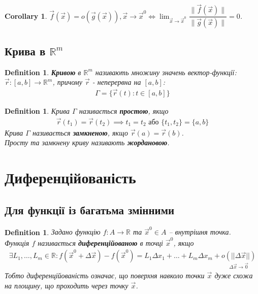 \documentclass[a4paper, 10pt]{article}
\theoremstyle{theoremdd}
\theoremstyle{theoremdd}
\theoremstyle{theoremdd}
\newtheorem{definition}[theorem]{Definition}
\theoremstyle{theoremdd}
\theoremstyle{theoremdd}
\theoremstyle{theoremdd}
\theoremstyle{theoremdd}
\theoremstyle{theoremdd}
\theoremstyle{theoremdd}
\newtheorem{corollary}[theorem]{Corollary}
\newcommand\Norm[1]{\|#1\|}
\begin{document}
\begin{corollary}
$\vec{f}(\vec{x}) = o(\vec{g}(\vec{x})), \vec{x} \to \vec{x}^0 \iff \displaystyle\lim_{\vec{x} \to \vec{x}^0} \dfrac{\Norm{\vec{f}(\vec{x})}}{\Norm{\vec{g}(\vec{x})}} = 0$.
\end{corollary}

\subsection{Крива в $\mathbb{R}^m$}
\begin{definition}
\textbf{Кривою} в $\mathbb{R}^m$ називають множину значень вектор-функції: $\vec{r}: [a,b] \to \mathbb{R}^m$, причому $\vec{r}$ - неперервна на $[a,b]$:
\begin{align*}
\Gamma = \{ \vec{r}(t): t \in [a,b]\}
\end{align*}
\end{definition}

\begin{definition}
Крива $\Gamma$ називається \textbf{простою}, якщо
\begin{align*}
\vec{r}(t_1) = \vec{r}(t_2) \implies t_1 = t_2 \text{ або } \{t_1,t_2\} = \{a,b\}
\end{align*}
Крива $\Gamma$ називається \textbf{замкненою}, якщо $\vec{r}(a) = \vec{r}(b)$.\\
Просту та замкнену криву називають \textbf{жордановою}.
\end{definition}

\newpage

\section{Диференційованість}
\subsection{Для функції із багатьма змінними}
\begin{definition}
Задано функцію $f \colon A \to \mathbb{R}$ та $\vec{x}^0 \in A$ -- внутрішня точка.\\
Функція $f$ називається \textbf{диференційованою} в точці $\vec{x}^0$, якщо
\begin{align*}
\exists L_1,\dots, L_m \in \mathbb{R}: f(\vec{x}^0 + \Delta \vec{x}) - f(\vec{x}^0) = L_1 \Delta x_1 + \dots + L_m \Delta x_m + \underset{\Delta \vec{x} \to \vec{0}}{o(||\Delta \vec{x}||)}
\end{align*}
Тобто диференційованість означає, що поверхня навколо точки $\vec{x}$ дуже схожа на площину, що проходить через точку $\vec{x}$.
\end{definition}
\end{document}

